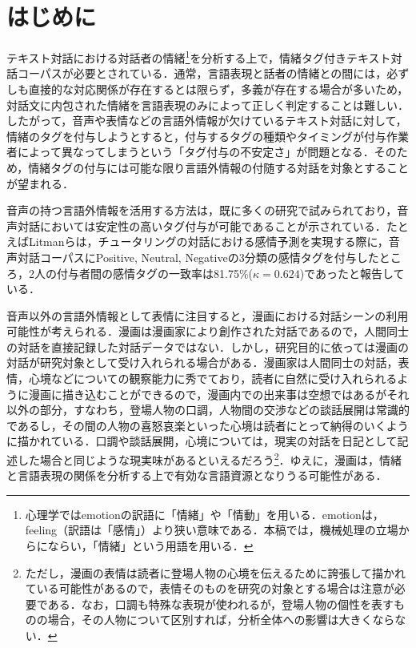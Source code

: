 \documentclass[japanese]{jnlp_1.3c}
\begin{document}
\maketitle





\section{はじめに}

テキスト対話における対話者の情緒\footnote{心理学ではemotionの訳語に「情緒」や「情動」を用いる．emotionは，feeling（訳語は「感情」）より狭い意味である．本稿では，機械処理の立場から\cite{徳久&岡田98}にならい，「情緒」という用語を用いる．}を分析する上で，情緒タグ付きテキスト対話コーパスが必要とされている．通常，言語表現と話者の情緒との間には，必ずしも直接的な対応関係が存在するとは限らず，多義が存在する場合が多いため，対話文に内包された情緒を言語表現のみによって正しく判定することは難しい．したがって，音声や表情などの言語外情報が欠けているテキスト対話に対して，情緒のタグを付与しようとすると，付与するタグの種類やタイミングが付与作業者によって異なってしまうという「タグ付与の不安定さ」が問題となる．そのため，情緒タグの付与には可能な限り言語外情報の付随する対話を対象とすることが望まれる．

音声の持つ言語外情報を活用する方法は，既に多くの研究で試みられており，音声対話においては安定性の高いタグ付与が可能であることが示されている．たとえばLitmanらは，チュータリングの対話における感情予測を実現する際に，音声対話コーパスにPositive, Neutral, Negativeの3分類の感情タグを付与したところ，2人の付与者間の感情タグの一致率は81.75\%($\kappa=0.624$)であったと報告している\cite{Litman03}．

音声以外の言語外情報として表情に注目すると，漫画における対話シーンの利用可能性が考えられる．漫画は漫画家により創作された対話であるので，人間同士の対話を直接記録した対話データではない．しかし，研究目的に依っては漫画の対話が研究対象として受け入れられる場合がある．漫画家は人間同士の対話，表情，心境などについての観察能力に秀でており，読者に自然に受け入れられるように漫画に描き込むことができるので，漫画内での出来事は空想ではあるがそれ以外の部分，すなわち，登場人物の口調，人物間の交渉などの談話展開は常識的であるし，その間の人物の喜怒哀楽といった心境は読者にとって納得のいくように描かれている．口調や談話展開，心境については，現実の対話を日記として記述した場合と同じような現実味があるといえるだろう\footnote{ただし，漫画の表情は読者に登場人物の心境を伝えるために誇張して描かれている可能性があるので，表情そのものを研究の対象とする場合は注意が必要である．なお，口調も特殊な表現が使われるが，登場人物の個性を表すものの場合，その人物について区別すれば，分析全体への影響は大きくならない．}．ゆえに，漫画は，情緒と言語表現の関係を分析する上で有効な言語資源となりうる可能性がある．
\end{document}
